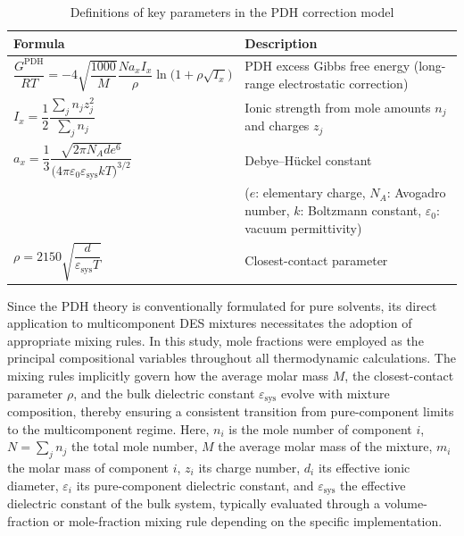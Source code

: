 \documentclass[AMA,LATO2COL]{WileyNJDv5} %
\begin{document}
\begin{table}[!htbp]
  \centering
  \caption{Definitions of key parameters in the PDH correction model}
  \label{tab:pdh_params}
  \begin{tabular}{ll}
    \hline
    Formula & Description \\
    \hline
    $\dfrac{G^\text{PDH}}{RT} = -4\sqrt{\dfrac{1000}{M}} \dfrac{N a_x I_x}{\rho} \ln\!\big(1+\rho\sqrt{I_x}\big)$
    & PDH excess Gibbs free energy (long-range electrostatic correction) \\
    $I_x = \dfrac{1}{2}\dfrac{\sum_j n_j z_j^2}{\sum_j n_j}$
    & Ionic strength from mole amounts \(n_j\) and charges \(z_j\) \\
    $a_x = \dfrac{1}{3}
    \dfrac{\sqrt{2\pi N_A d e^6}}{\big(4\pi\varepsilon_0 \varepsilon_\text{sys} kT\big)^{3/2}}$
    & Debye–Hückel constant \\
    & ($e$: elementary charge, $N_A$: Avogadro number, $k$: Boltzmann constant, $\varepsilon_0$: vacuum permittivity) \\
    $\rho = 2150\sqrt{\dfrac{d}{\varepsilon_\text{sys} T}}$
    & Closest-contact parameter \\
    \hline
  \end{tabular}
\end{table}

Since the PDH theory is conventionally formulated for pure solvents, its direct application to multicomponent DES mixtures necessitates the adoption of appropriate mixing rules. In this study, mole fractions were employed as the principal compositional variables throughout all thermodynamic calculations. The mixing rules implicitly govern how the average molar mass $M$, the closest-contact parameter $\rho$, and the bulk dielectric constant $\varepsilon_\text{sys}$ evolve with mixture composition, thereby ensuring a consistent transition from pure-component limits to the multicomponent regime. Here, \(n_i\) is the mole number of component \(i\),
\(N = \sum_j n_j\) the total mole number,
\(M\) the average molar mass of the mixture,
\(m_i\) the molar mass of component \(i\),
\(z_i\) its charge number,
\(d_i\) its effective ionic diameter,
\(\varepsilon_i\) its pure-component dielectric constant,
and \(\varepsilon_\text{sys}\) the effective dielectric constant of the bulk system, typically evaluated through a volume-fraction or mole-fraction mixing rule depending on the specific implementation.
\end{document}

